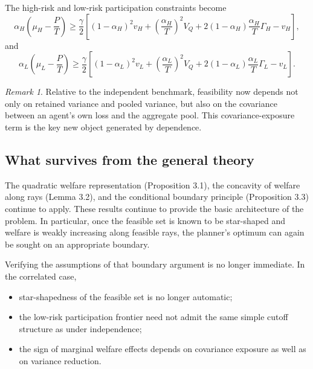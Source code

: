\documentclass[a4paper,12pt]{article}
\theoremstyle{definition}
\theoremstyle{remark}
\newtheorem{remark}[theorem]{Remark}
\newcommand{\1}{\mathbf{1}}
\begin{document}

The high-risk and low-risk participation constraints become
\begin{equation}\label{eq:IRH-corr-new}
\alpha_H\!\left(\mu_H-\frac{P}{T}\right)
\ge
\frac{\gamma}{2}
\left[
(1-\alpha_H)^2v_H
+
\left(\frac{\alpha_H}{T}\right)^2V_Q
+
2(1-\alpha_H)\frac{\alpha_H}{T}\Gamma_H
-
v_H
\right],
\end{equation}
and
\begin{equation}\label{eq:IRL-corr-new}
\alpha_L\!\left(\mu_L-\frac{P}{T}\right)
\ge
\frac{\gamma}{2}
\left[
(1-\alpha_L)^2v_L
+
\left(\frac{\alpha_L}{T}\right)^2V_Q
+
2(1-\alpha_L)\frac{\alpha_L}{T}\Gamma_L
-
v_L
\right].
\end{equation}

\begin{remark}
Relative to the independent benchmark, feasibility now depends not only on
retained variance and pooled variance, but also on the covariance between an
agent's own loss and the aggregate pool. This covariance-exposure term is the
key new object generated by dependence.
\end{remark}

\subsection{What survives from the general theory}

The quadratic welfare representation (Proposition 3.1), the concavity of welfare along rays (Lemma 3.2), and the conditional boundary principle (Proposition 3.3) continue to apply. These results continue to provide the basic architecture of the problem.
In particular, once the feasible set is known to be star-shaped and welfare is
weakly increasing along feasible rays, the planner's optimum can again be
sought on an appropriate boundary.

Verifying the assumptions of that boundary argument is no longer immediate. In the correlated case,
\begin{itemize}[leftmargin=2em]
    \item star-shapedness of the feasible set is no longer automatic;
    \item the low-risk participation frontier need not admit the same simple
    cutoff structure as under independence;
    \item the sign of marginal welfare effects depends on covariance exposure
    as well as on variance reduction.
\end{itemize}
\end{document}
